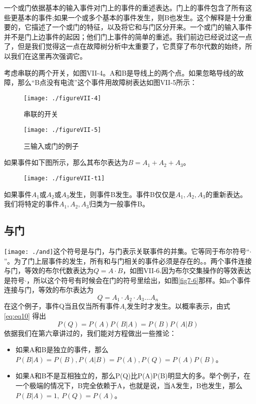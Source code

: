 \documentclass[cn,11pt,chinese]{elegantbook}
\begin{document}
{一个或门依据基本的输入事件对门上的事件的重述表达。门上的事件包含了所有这些更基本的事件;如果一个或多个基本的事件发生，则B也发生。这个解释是十分重要的，它描述了一个或门的特征，以及将它和与门区分开来。一个或门的输入事件并不是门上边事件的起因；他们门上事件的简单的重述。我们前边已经说过这一点了，但是我们觉得这一点在故障树分析中太重要了，它贯穿了布尔代数的始终，所以我们在这里再次强调它。

考虑串联的两个开关，如图VII-4。A和B是导线上的两个点。如果忽略导线的故障，那么“B点没有电流”这个事件用故障树表达如图VII-5所示：

\begin{figure}[htpb]
	\texttt{[image: ./figureVII-4]}
	\caption{串联的开关}\label{fig7-4}
\end{figure}

\begin{figure}[htpb]
	\texttt{[image: ./figureVII-5]}
	\caption{三输入或门的例子}
	\label{fig7-5}
\end{figure}

如果事件如下图所示，那么其布尔表达为$B=A_1+A_2+A_3$。

\begin{figure}[H]
	\texttt{[image: ./figureVII-t1]}
\end{figure}

如果事件$A_1或A_2或A_3$发生，则事件B发生。事件B仅仅是$A_1,A_2,A_3$的重新表达。我们将特定的事件$A_1, A_2, A_3$归类为一般事件B。

\subsection{与门}

\texttt{[image: ./and]}这个符号是与门，与门表示关联事件的并集。它等同于布尔符号“$\cdot$”。为了门上层事件的发生，所有和与门相关的事件必须是存在的。。两个事件连接与门，等效的布尔代数表达为$Q=A\cdot B$，如图VII-6.因为布尔交集操作的等效表达是符号$\cdot$，所以这个符号有时候会在门的符号里绘出，如图\ref{fig7-6}那样。如n个事件连接与门，等效的布尔表达为
$$Q=A_1 \cdot A_2 \cdot A_3 ... A_n$$
在这个例子，事件Q当且仅当所有事件$A_i$发生时才发生。以概率表示，由式\ref{eq:eq10}
得出
$$P(Q)=P(A)P(B|A)=P(B)P(A|B)$$
依据我们在第六章讲过的，我们能对方程做出一些推论：
\begin{itemize}
	\item 如果A和B是独立的事件，那么$P(B|A)=P(B),P(A|B)=P(A),P(Q)=P(A)P(B)$。
\item  如果A和B不是互相独立的，那么P(Q)比P(A)P(B)明显大的多。举个例子，在一个极端的情况下，B完全依赖于A，也就是说，当A发生，B也发生，那么$P(B|A)=1, \ P(Q)=P(A)$。
\end{itemize}

}
\end{document}
